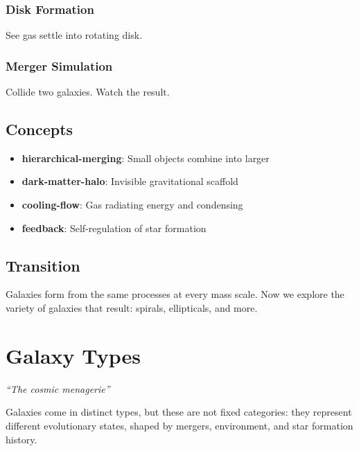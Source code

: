\documentclass[
  11pt,
  letterpaper,
  twoside,
  openright]{book}
\providecommand{\tightlist}{%
  \setlength{\itemsep}{0pt}\setlength{\parskip}{0pt}}
\begin{document}
\subsection{Disk Formation}\label{disk-formation-1}

See gas settle into rotating disk.

\subsection{Merger Simulation}\label{merger-simulation}

Collide two galaxies. Watch the result.

\section{Concepts}\label{concepts-24}

\begin{itemize}
\tightlist
\item
  \textbf{hierarchical-merging}: Small objects combine into larger
\item
  \textbf{dark-matter-halo}: Invisible gravitational scaffold
\item
  \textbf{cooling-flow}: Gas radiating energy and condensing
\item
  \textbf{feedback}: Self-regulation of star formation
\end{itemize}

\section{Transition}\label{transition-24}

Galaxies form from the same processes at every mass scale. Now we
explore the variety of galaxies that result: spirals, ellipticals, and
more.

\chapter{Galaxy Types}\label{sec-galaxy-types}

\emph{``The cosmic menagerie''}

\begin{tcolorbox}[enhanced jigsaw, coltitle=black, colbacktitle=quarto-callout-note-color!10!white, toprule=.15mm, colframe=quarto-callout-note-color-frame, arc=.35mm, opacityback=0, bottomtitle=1mm, toptitle=1mm, breakable, colback=white, titlerule=0mm, opacitybacktitle=0.6, title=\textcolor{quarto-callout-note-color}{\faInfo}\hspace{0.5em}{Key Revelation}, rightrule=.15mm, bottomrule=.15mm, leftrule=.75mm, left=2mm]

Galaxies come in distinct types, but these are not fixed categories:
they represent different evolutionary states, shaped by mergers,
environment, and star formation history.

\end{tcolorbox}
\end{document}
